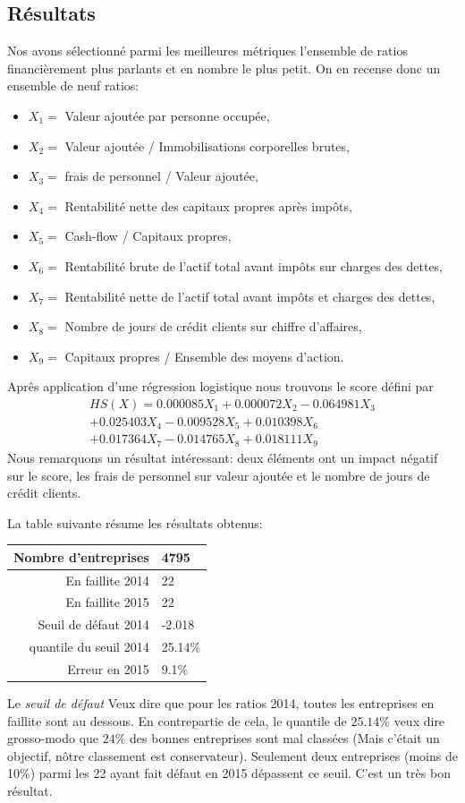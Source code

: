 \documentclass[DIV=calc, paper=a4, fontsize=11pt, twocolumn]{scrartcl}
\begin{document}
\subsection{Résultats}
Nos avons sélectionné parmi les meilleures métriques l'ensemble de ratios financièrement plus parlants et en nombre le plus petit. On en recense donc un ensemble de neuf ratios:
\begin{itemize} %
  \item $X_1=$ Valeur ajoutée par personne occupée,
  \item $X_2=$ Valeur ajoutée / Immobilisations corporelles brutes,
  \item $X_3=$ frais de personnel / Valeur ajoutée,
  \item $X_4=$ Rentabilité nette des capitaux propres après impôts,
  \item $X_5=$ Cash-flow / Capitaux propres,
  \item $X_6=$ Rentabilité brute de l’actif total avant impôts sur charges des dettes,
  \item $X_7=$ Rentabilité nette de l’actif total avant impôts et charges des dettes, 
  \item $X_8=$ Nombre de jours de crédit clients sur chiffre d'affaires,
  \item $X_9=$ Capitaux propres / Ensemble des moyens d’action.
\end{itemize}
Aprês application d'une régression logistique nous trouvons le score défini par 
\begin{multline}
HS(X) = 0.000085X_1+0.000072X_2-0.064981X_3\\
+0.025403X_4-0.009528X_5+0.010398X_6\\
+0.017364X_7-0.014765X_8+0.018111X_9
\end{multline}
Nous remarquons un résultat intéressant: deux éléments ont un impact négatif sur le score, les frais de personnel sur valeur ajoutée et le nombre de jours de crédit clients. 

La table suivante résume les résultats obtenus:
\begin{center}
  \begin{tabular}{ | r || l |}
    \hline
    Nombre d'entreprises & 4795  \\ \hline
    En faillite 2014 & 22  \\ \hline
    En faillite 2015 & 22  \\ \hline
    Seuil de défaut 2014 & -2.018 \\ \hline
    quantile du seuil 2014 & 25.14\% \\ \hline
    Erreur en 2015 & 9.1\% \\ \hline
  \end{tabular}
\end{center}
Le \emph{seuil de défaut} Veux dire que pour les ratios 2014, toutes les entreprises en faillite sont au dessous. En contrepartie de cela, le quantile de $25.14\%$ veux dire grosso-modo que $24\%$ des bonnes entreprises sont mal classées (Mais c'était un objectif, nôtre classement est conservateur). Seulement deux entreprises (moins de 10\%) parmi les 22 ayant fait défaut en 2015 dépassent ce seuil. C'est un très bon résultat.
\end{document}
